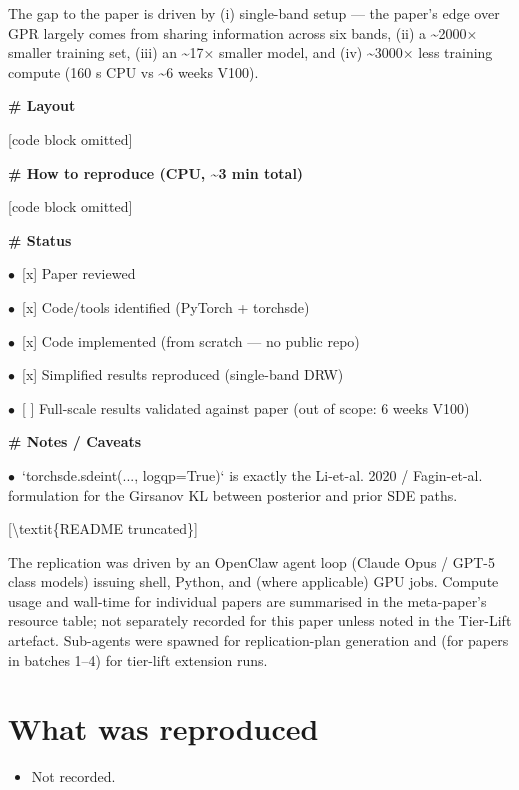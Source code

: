 \documentclass[11pt]{article}
\begin{document}
The gap to the paper is driven by (i) single-band setup — the paper's edge over GPR largely comes
from sharing information across six bands, (ii) a \textasciitilde{}2000× smaller training set, (iii) an \textasciitilde{}17×
smaller model, and (iv) \textasciitilde{}3000× less training compute (160 s CPU vs \textasciitilde{}6 weeks V100).

\par\medskip\textbf{\# Layout}\par

[code block omitted]

\par\medskip\textbf{\# How to reproduce (CPU, \textasciitilde{}3 min total)}\par

[code block omitted]

\par\medskip\textbf{\# Status}\par
\par$\bullet$\ [x] Paper reviewed
\par$\bullet$\ [x] Code/tools identified (PyTorch + torchsde)
\par$\bullet$\ [x] Code implemented (from scratch — no public repo)
\par$\bullet$\ [x] Simplified results reproduced (single-band DRW)
\par$\bullet$\ [ ] Full-scale results validated against paper (out of scope: 6 weeks V100)

\par\medskip\textbf{\# Notes / Caveats}\par
\par$\bullet$\ `torchsde.sdeint(..., logqp=True)` is exactly the Li-et-al. 2020 / Fagin-et-al. formulation for
  the Girsanov KL between posterior and prior SDE paths.

[\textbackslash{}textit\{README truncated\}]
\normalsize

The replication was driven by an OpenClaw agent loop (Claude Opus / GPT-5 class models) issuing shell, Python, and (where applicable) GPU jobs. Compute usage and wall-time for individual papers are summarised in the meta-paper's resource table; not separately recorded for this paper unless noted in the Tier-Lift artefact. Sub-agents were spawned for replication-plan generation and (for papers in batches 1--4) for tier-lift extension runs.

\section{What was reproduced}
\begin{itemize}
\item Not recorded.
\end{itemize}
\end{document}
